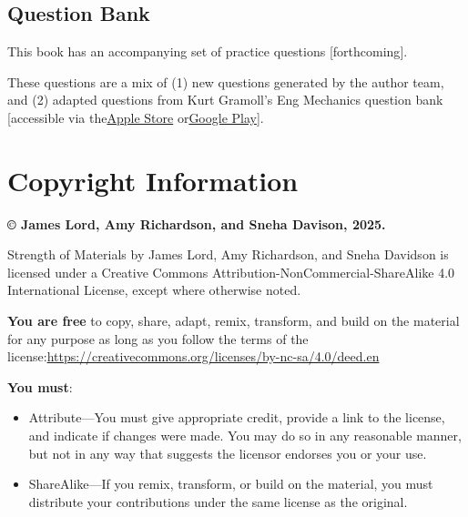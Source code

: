 \documentclass[
  letterpaper,
  DIV=11,
  numbers=noendperiod]{scrreprt}
\theoremstyle{definition}
\theoremstyle{remark}
\begin{document}
\subsection*{\texorpdfstring{\textbf{Question
Bank}}{Question Bank}}\label{question-bank}

This book has an accompanying set of practice questions
{[}forthcoming{]}.

These questions are a mix of (1) new questions generated by the author
team, and (2) adapted questions from Kurt Gramoll's Eng Mechanics
question bank {[}accessible via
the\href{https://apps.apple.com/us/app/eng-mechanics/id1526030024}{Apple
Store}
or\href{https://play.google.com/store/apps/details?id=air.com.gramago.engProbME&pli=1}{Google
Play}{]}.

\section*{\texorpdfstring{\textbf{Copyright
Information}}{Copyright Information}}\label{copyright-information}


\textbf{© James Lord, Amy Richardson, and Sneha Davison, 2025.}

Strength of Materials by James Lord, Amy Richardson, and Sneha Davidson
is licensed under a Creative Commons
Attribution-NonCommercial-ShareAlike 4.0 International License, except
where otherwise noted.

\textbf{You are free} to copy, share, adapt, remix, transform, and build
on the material for any purpose as long as you follow the terms of the
license:\href{https://creativecommons.org/licenses/by-sa/4.0/}{}\url{https://creativecommons.org/licenses/by-nc-sa/4.0/deed.en}

\textbf{You must}:

\begin{itemize}
\item
  Attribute---You must give appropriate credit, provide a link to the
  license, and indicate if changes were made. You may do so in any
  reasonable manner, but not in any way that suggests the licensor
  endorses you or your use.
\item
  ShareAlike---If you remix, transform, or build on the material, you
  must distribute your contributions under the same license as the
  original.
\end{itemize}
\end{document}
